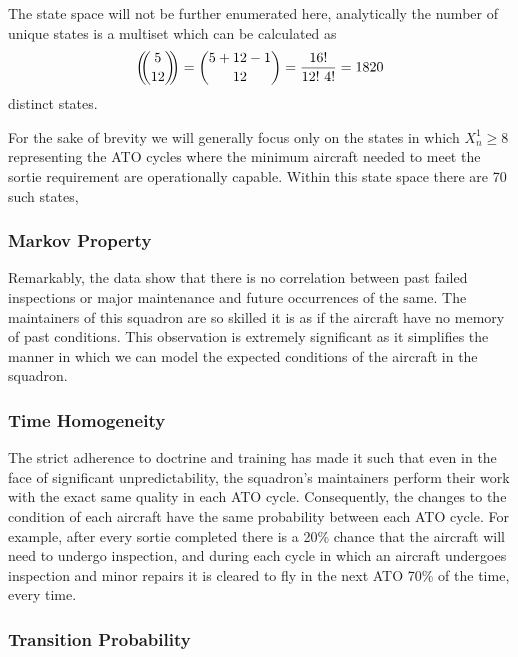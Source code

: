 \documentclass[12pt]{amsart}
\begin{document}
The state space will not be further enumerated here, analytically the 
number of unique states is a multiset which can be calculated as
\begin{align}
	\left( \hspace{-0.4em} \binom{5}{12} \hspace{-0.4em} \right) 
	=\binom{5+12-1}{12}
	=\frac{16!}{12!\ 4!}
	= 1820
\end{align}
distinct states.

For the sake of brevity we will generally focus only on the states in which
\(X_n^1\geq8\) representing the ATO cycles where the minimum aircraft
needed to meet the sortie requirement are operationally capable.
Within this state space there are 70 such states,

\subsubsection{Markov Property}

Remarkably, the data show that there is no correlation between past failed
inspections or major maintenance and future occurrences of the same.
The maintainers of this squadron are so skilled it is as if the 
aircraft have no memory of past conditions.
This observation is extremely significant as it simplifies the manner 
in which we can model the expected conditions of the aircraft in the squadron.

\subsubsection{Time Homogeneity}

The strict adherence to doctrine and training has made it such that 
even in the face of significant unpredictability,
the squadron's maintainers perform their work with the exact
same quality in each ATO cycle.
Consequently, the changes to the condition of each aircraft have the 
same probability between each ATO cycle. 
For example, after every sortie completed there is a 20\% chance that
the aircraft will need to undergo inspection, and during each 
cycle in which an aircraft undergoes inspection and minor repairs
it is cleared to fly in the next ATO 70\% of the time, every time.

\subsubsection{Transition Probability}

\end{document}
